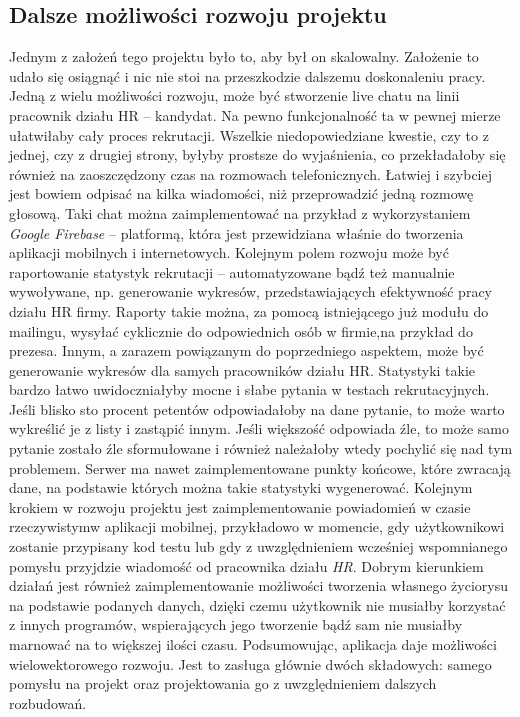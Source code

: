\documentclass[twoside]{projektInzynierskiMS}
\numberwithin{figure}{section}
\begin{document}
\subsection{Dalsze możliwości rozwoju projektu}
Jednym z założeń tego projektu było to, aby był on skalowalny. Założenie to udało się osiągnąć i nic nie stoi na przeszkodzie dalszemu doskonaleniu pracy. 
Jedną z wielu możliwości rozwoju, może być stworzenie live chatu na linii pracownik działu HR -- kandydat. Na pewno funkcjonalność ta w pewnej mierze ułatwiłaby cały proces rekrutacji. Wszelkie niedopowiedziane kwestie, czy to z jednej, czy z drugiej strony, byłyby prostsze do wyjaśnienia, co przekładałoby się również na zaoszczędzony czas na rozmowach telefonicznych. Łatwiej i szybciej jest bowiem odpisać na kilka wiadomości, niż przeprowadzić jedną rozmowę głosową. Taki chat można zaimplementować na przykład z wykorzystaniem \textit{Google Firebase} -- platformą, która jest przewidziana właśnie do tworzenia aplikacji mobilnych i internetowych.
Kolejnym polem rozwoju może być raportowanie statystyk rekrutacji -- automatyzowane bądź też manualnie wywoływane, np. generowanie wykresów, przedstawiających efektywność pracy działu HR firmy. Raporty takie można, za pomocą istniejącego już modułu do mailingu, wysyłać cyklicznie do odpowiednich osób w firmie,\linebreak na przykład do prezesa. Innym, a zarazem powiązanym do poprzedniego aspektem, może być generowanie wykresów dla samych pracowników działu HR. Statystyki takie bardzo łatwo uwidoczniałyby mocne i słabe pytania w testach rekrutacyjnych. Jeśli blisko sto procent petentów odpowiadałoby na dane pytanie, to może warto wykreślić je z listy i zastąpić innym. Jeśli większość odpowiada źle, to może samo pytanie zostało źle sformułowane i również należałoby wtedy pochylić się nad tym problemem. Serwer ma nawet zaimplementowane punkty końcowe, które zwracają dane, na podstawie których można takie statystyki wygenerować. Kolejnym krokiem w rozwoju projektu jest zaimplementowanie powiadomień w czasie rzeczywistym\linebreak w aplikacji mobilnej, przykładowo w momencie, gdy użytkownikowi zostanie przypisany kod testu lub gdy z uwzględnieniem wcześniej wspomnianego pomysłu przyjdzie wiadomość od pracownika działu \textit{HR}. Dobrym kierunkiem działań jest również zaimplementowanie możliwości tworzenia własnego życiorysu na podstawie podanych danych, dzięki czemu użytkownik nie musiałby korzystać z innych programów, wspierających jego tworzenie bądź sam nie musiałby marnować na to większej ilości czasu. Podsumowując, aplikacja daje możliwości wielowektorowego rozwoju. Jest to zasługa głównie dwóch składowych: samego pomysłu na projekt oraz projektowania go z uwzględnieniem dalszych rozbudowań.
\end{document}
